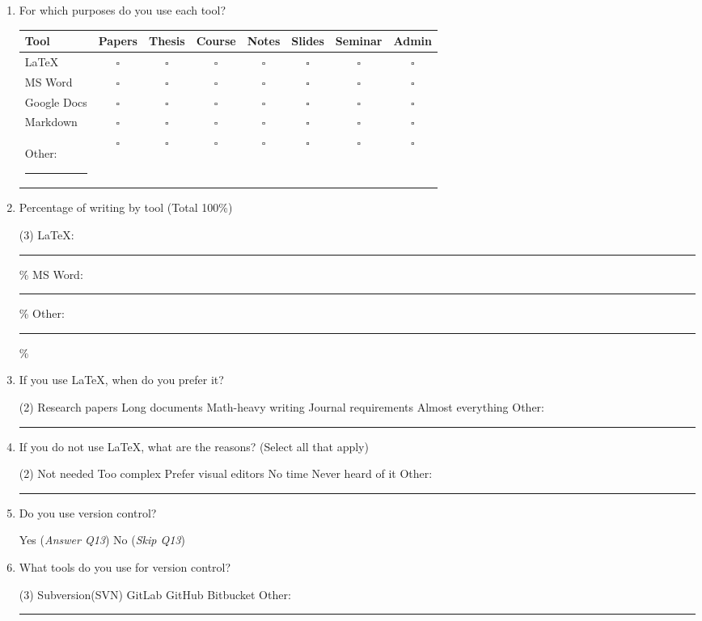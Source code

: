 \documentclass[a4paper,12pt]{article}
\begin{document}
\begin{enumerate}[resume]

\item For which purposes do you use each tool?

\vspace{0.3cm}

{\small
\begin{tabular}{@{}lccccccc@{}}
\toprule
\textbf{Tool} & \textbf{Papers} & \textbf{Thesis} & \textbf{Course} & \textbf{Notes} & \textbf{Slides}& \textbf{Seminar} & \textbf{Admin} \\
\midrule
LaTeX        & $\square$ & $\square$ & $\square$ & $\square$ & $\square$ & $\square$ & $\square$\\
MS Word      & $\square$ & $\square$ & $\square$ & $\square$ & $\square$ & $\square$ & $\square$ \\
Google Docs  & $\square$ & $\square$ & $\square$ & $\square$ & $\square$ & $\square$ & $\square$ \\
Markdown    & $\square$ & $\square$ & $\square$ & $\square$ & $\square$ & $\square$  & $\square$ \\
Other: \rule{2.5cm}{0.4pt}    & $\square$ & $\square$ & $\square$ & $\square$ & $\square$ & $\square$  & $\square$ \\

\bottomrule
\end{tabular}
}
\newpage
\item Percentage of writing by tool (Total 100\%)
\begin{tasks}(3)
\task LaTeX: \rule{1.2cm}{0.4pt}\%
\task MS Word: \rule{1.2cm}{0.4pt}\%
\task Other: \rule{1.2cm}{0.4pt}\%
\end{tasks}

\item If you use LaTeX, when do you prefer it?
\begin{tasks}(2)
\task Research papers
\task Long documents
\task Math-heavy writing
\task Journal requirements
\task Almost everything
\task Other: \rule{2.5cm}{0.4pt}
\end{tasks}

\item If you do not use LaTeX, what are the reasons? (Select all that apply)
\begin{tasks}(2)
\task Not needed
\task Too complex
\task Prefer visual editors
\task No time
\task Never heard of it
\task Other: \rule{2.5cm}{0.4pt}
\end{tasks}
\item Do you use version control?
\begin{tasks}
    \task Yes (\textit{Answer Q13})
    \task No (\textit{Skip Q13})
\end{tasks}
\item What tools do you use for version control?
\begin{tasks}(3)
    \task Subversion(SVN)
    \task GitLab
    \task GitHub
    \task Bitbucket
    \task Other: \rule{2.5cm}{0.4pt}
    

\end{tasks}
\end{enumerate}
\end{document}
